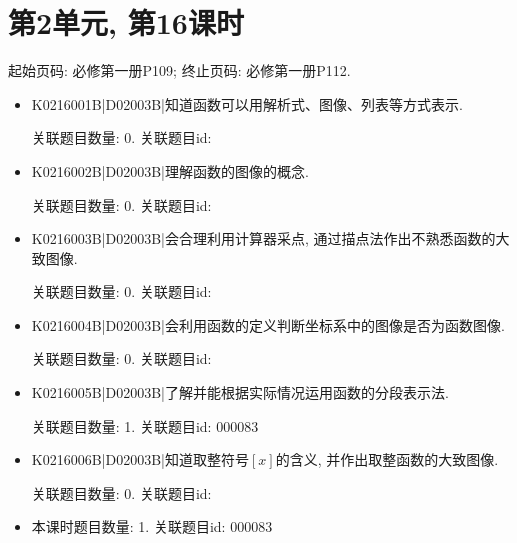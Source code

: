\section*{第2单元, 第16课时}
起始页码: 必修第一册P109; 终止页码: 必修第一册P112.
\begin{itemize}
\item K0216001B|D02003B|知道函数可以用解析式、图像、列表等方式表示.

关联题目数量: 0. 关联题目id: 

\item K0216002B|D02003B|理解函数的图像的概念.

关联题目数量: 0. 关联题目id: 

\item K0216003B|D02003B|会合理利用计算器采点, 通过描点法作出不熟悉函数的大致图像.

关联题目数量: 0. 关联题目id: 

\item K0216004B|D02003B|会利用函数的定义判断坐标系中的图像是否为函数图像.

关联题目数量: 0. 关联题目id: 

\item K0216005B|D02003B|了解并能根据实际情况运用函数的分段表示法.

关联题目数量: 1. 关联题目id: 000083

\item K0216006B|D02003B|知道取整符号$[x]$的含义, 并作出取整函数的大致图像.

关联题目数量: 0. 关联题目id: 

\item 本课时题目数量: 1. 关联题目id: 000083

\end{itemize}

